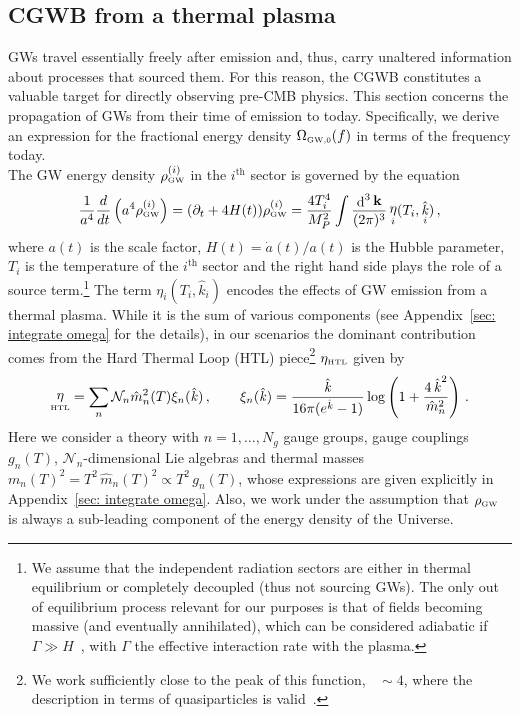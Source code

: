 \documentclass[a4paper,11pt]{article}
\DeclareMathOperator{\der}{\mathrm{d}}
\DeclareMathOperator{\heta}{\eta}
\DeclareMathOperator{\hk}{\hat{\mathit{k}}}
\begin{document}
\subsection{CGWB from a thermal plasma}

GWs travel essentially freely after emission and, thus, carry unaltered information about processes that sourced them. 
For this reason, the CGWB constitutes a valuable target for directly observing pre-CMB physics. 
This section concerns the propagation of GWs from their time of emission to today. 
Specifically, we derive an expression for the fractional energy density $\Omega_{\text{\tiny{GW},0}}(f)$ in terms of the frequency today.\\

The GW energy density $\rho_{\text{\tiny GW}}^{(i)}$ in the $i^{\text{th}}$ sector is governed by the equation
\begin{equation}
\label{eq:cosmoprod}
 \dfrac{1}{a^{4}}\frac{d}{d t} \left(a^4 \rho_{\text{\tiny GW}}^{(i)}\right)=   (\partial_t+4H(t))\rho_\text{\tiny{GW}}^{(i)}=\frac{4T_i^4}{M_{P}^2}\int{\frac{\der^3 \textbf{k}}{(2\pi) ^3} \heta_i (T_i, \hk_i)} \,,
\end{equation}
where $a(t)$ is the scale factor, $H(t) = \dot{a}(t)/a(t)$ is the Hubble parameter, $T_i$ is the temperature of the $i^{\text{th}}$ sector and the right hand side plays the role of a source term.\footnote{We assume that the independent radiation sectors are either in thermal equilibrium or completely decoupled (thus not sourcing GWs). The only out of equilibrium process relevant for our purposes is that of fields becoming massive (and eventually annihilated), which can be considered adiabatic if $\Gamma \gg H$~\cite{Bernstein:1988bw}, with $\Gamma$ the effective interaction rate with the plasma.} 
The term $\eta_i(T_i, \hat{k}_i)$ encodes the effects of GW emission from a thermal plasma. 
While it is the sum of various components (see Appendix~\ref{sec: integrate omega} for the details), in our scenarios the dominant contribution comes from the Hard Thermal Loop (HTL) piece\footnote{We work sufficiently close to the peak of this function, $\hk \sim 4$, where the description in terms of quasiparticles is valid~\cite{Ghiglieri:2015nfa,Ghiglieri:2020mhm,Ringwald:2020ist}.} $\eta_{\text{\tiny{HTL}}}$ given by
\begin{equation}\label{eq:eta_HTL}
    \heta_\text{\tiny{HTL}}=  \sum_n\mathcal{N}_n\hat{m}_n^2(T)\xi_n(\hk) \,,\qquad \xi_n(\hk)=\frac{\hk}{16\pi (e^{\hk}-1)}  \log \left ( 1+\frac{4\hk^2}{\hat{m}_n^2} \right ) \,.
\end{equation}
Here we consider a theory with $n=1,\ldots,N_g$ gauge groups, gauge couplings $g_n(T)$, $\mathcal{N}_n$-dimensional Lie algebras and thermal masses $m_n(T)^2 = T^2 \, \hat{m}_n(T)^2 \propto T^2 \, g_n(T)$, whose expressions are given explicitly in Appendix~\ref{sec: integrate omega}. 
Also, we work under the assumption that $\rho_\text{\tiny GW}$ is always a sub-leading component of the energy density of the Universe.
\end{document}
